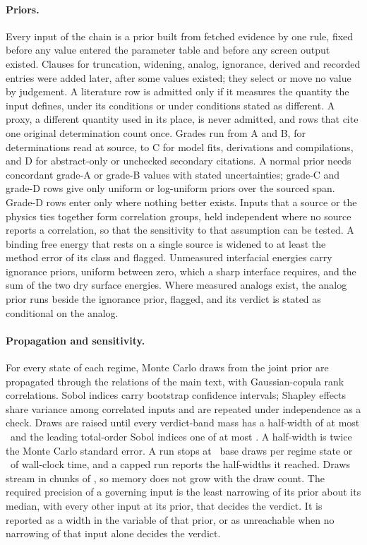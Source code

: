 \paragraph*{Priors.}
Every input of the chain is a prior built from fetched evidence by one rule, fixed before any value entered the parameter table and before any screen output existed. %
Clauses for truncation, widening, analog, ignorance, derived and recorded entries were added later, after some values existed; they select or move no value by judgement. %
A literature row is admitted only if it measures the quantity the input defines, under its conditions or under conditions stated as different. %
A proxy, a different quantity used in its place, is never admitted, and rows that cite one original determination count once. %
Grades run from A and B, for determinations read at source, to C for model fits, derivations and compilations, and D for abstract-only or unchecked secondary citations. %
A normal prior needs concordant grade-A or grade-B values with stated uncertainties; grade-C and grade-D rows give only uniform or log-uniform priors over the sourced span. %
Grade-D rows enter only where nothing better exists. %
Inputs that a source or the physics ties together form correlation groups, held independent where no source reports a correlation, so that the sensitivity to that assumption can be tested. %
A binding free energy that rests on a single source is widened to at least the method error of its class and flagged. %
Unmeasured interfacial energies carry ignorance priors, uniform between zero, which a sharp interface requires, and the sum of the two dry surface energies. %
Where measured analogs exist, the analog prior runs beside the ignorance prior, flagged, and its verdict is stated as conditional on the analog. %

\paragraph*{Propagation and sensitivity.}
For every state of each regime, Monte Carlo draws from the joint prior are propagated through the relations of the main text, with Gaussian-copula rank correlations. %
Sobol indices carry bootstrap confidence intervals; Shapley effects share variance among correlated inputs and are repeated under independence as a check. %
Draws are raised until every verdict-band mass has a half-width of at most \NumSizingBandHalfWidth\ and the leading total-order Sobol indices one of at most \NumSizingSobolHalfWidth. %
A half-width is twice the Monte Carlo standard error. %
A run stops at \NumSizingDrawCap\ base draws per regime state or \NumSizingWallClockCap\ of wall-clock time, and a capped run reports the half-widths it reached. %
Draws stream in chunks of \NumSizingChunk, so memory does not grow with the draw count. %
The required precision of a governing input is the least narrowing of its prior about its median, with every other input at its prior, that decides the verdict. %
It is reported as a width in the variable of that prior, or as unreachable when no narrowing of that input alone decides the verdict. %


